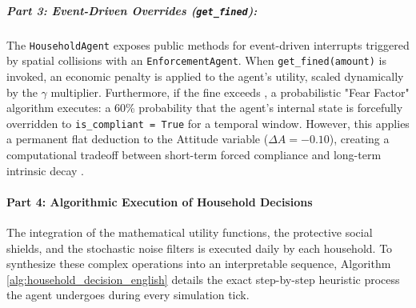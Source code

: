 \subparagraph{Part 3: Event-Driven Overrides (\texttt{get\_fined}):} 
The \texttt{HouseholdAgent} exposes public methods for event-driven interrupts triggered by spatial collisions with an \texttt{EnforcementAgent}. When \texttt{get\_fined(amount)} is invoked, an economic penalty is applied to the agent's utility, scaled dynamically by the $\gamma$ multiplier. Furthermore, if the fine exceeds , a probabilistic "Fear Factor" algorithm executes: a 60\% probability that the agent's internal state is forcefully overridden to \texttt{is\_compliant = True} for a temporal window. However, this applies a permanent flat deduction to the Attitude variable ($\Delta A = -0.10$), creating a computational tradeoff between short-term forced compliance and long-term intrinsic decay \citep{Hertweck2023}.

\paragraph{Part 4: Algorithmic Execution of Household Decisions}

The integration of the mathematical utility functions, the protective social shields, and the stochastic noise filters is executed daily by each household. To synthesize these complex operations into an interpretable sequence, Algorithm \ref{alg:household_decision_english} details the exact step-by-step heuristic process the agent undergoes during every simulation tick.

